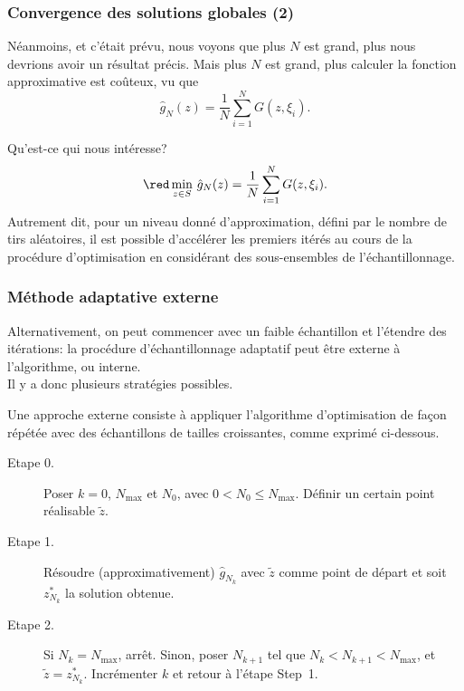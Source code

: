 \documentclass[french]{beamer}
\begin{document}
\begin{frame}
\frametitle{Convergence des solutions globales (2)}

Néanmoins, et c'était prévu, nous voyons que plus $N$ est grand, plus
nous devrions avoir un résultat précis. Mais plus $N$ est grand, plus
calculer la fonction approximative est coûteux, vu que
\[
\hat{g}_N(z) = \frac{1}{N} \sum_{i = 1}^N G (z, \xi_i).
\]

\mbox{}

Qu'est-ce qui nous intéresse?
\[
{\red \min_{z \in S}}\ \hat{g}_N(z) = \frac{1}{N} \sum_{i = 1}^N G (z, \xi_i).
\]
Autrement dit, pour un niveau donné d'approximation, défini par le
nombre de tirs aléatoires, il est possible d'accélérer les premiers
itérés au cours de la procédure d'optimisation en considérant des
sous-ensembles de l'échantillonnage.\\

\end{frame}

\begin{frame}
\frametitle{Méthode adaptative externe}

Alternativement, on peut commencer avec un faible échantillon et
l'étendre des itérations: 
la procédure d'échantillonnage adaptatif peut être {\blue externe} à
l'algorithme, ou {\blue interne}.
\\
Il y a donc {\red plusieurs stratégies possibles.}

\mbox{}

Une approche externe consiste à appliquer l'algorithme d'optimisation
de façon répétée avec des échantillons de tailles croissantes, comme
exprimé ci-dessous.
\begin{description}
\item[Etape 0.] Poser $k = 0$, $N_{\max}$ et $N_0$, avec $0 <
N_0 \leq N_{\max}$. Définir un certain point réalisable $\tilde{z}$.
\item[Etape 1.] Résoudre (approximativement) $\hat{g}_{N_k}$ avec
  $\tilde{z}$ comme point de départ et soit $z^*_{N_k}$ la solution
  obtenue.
\item[Etape 2.] Si $N_k = N_{\max}$, arrêt. Sinon, poser $N_{k+1}$ tel
  que $N_k < N_{k+1} < N_{\max}$, et $\tilde{z} = z^*_{N_k}$.
Incrémenter $k$ et retour à l'étape Step~1.
\end{description}

\end{frame}
\end{document}
